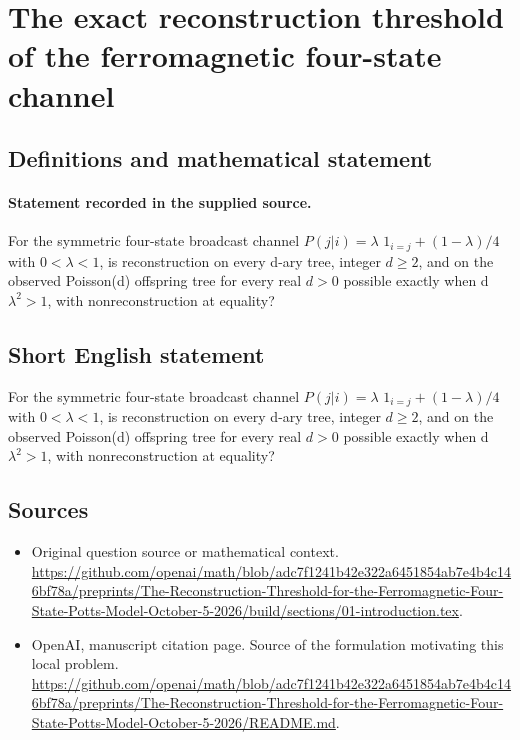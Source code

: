 \documentclass[11pt]{article}
\begin{document}
\section*{The exact reconstruction threshold of the ferromagnetic four-state channel}\label{30007361}
\subsection{Definitions and mathematical statement}
\paragraph{Statement recorded in the supplied source.}
For the symmetric four-state broadcast channel $P(j|i)=\lambda $ $1_{i=j}+(1-\lambda )/4$ with $0<\lambda <1$, is reconstruction on every d-ary tree, integer $d\geq 2$, and on the observed Poisson(d) offspring tree for every real $d>0$ possible exactly when d $\lambda ^2>1$, with nonreconstruction at equality?
\subsection{Short English statement}
For the symmetric four-state broadcast channel $P(j|i)=\lambda $ $1_{i=j}+(1-\lambda )/4$ with $0<\lambda <1$, is reconstruction on every d-ary tree, integer $d\geq 2$, and on the observed Poisson(d) offspring tree for every real $d>0$ possible exactly when d $\lambda ^2>1$, with nonreconstruction at equality?
\subsection{Sources}
\begin{itemize}
\item[S1] Original question source or mathematical context.
\url{https://github.com/openai/math/blob/adc7f1241b42e322a6451854ab7e4b4c146bf78a/preprints/The-Reconstruction-Threshold-for-the-Ferromagnetic-Four-State-Potts-Model-October-5-2026/build/sections/01-introduction.tex}.
\item[S2] OpenAI, manuscript citation page. Source of the formulation motivating this local problem.
\url{https://github.com/openai/math/blob/adc7f1241b42e322a6451854ab7e4b4c146bf78a/preprints/The-Reconstruction-Threshold-for-the-Ferromagnetic-Four-State-Potts-Model-October-5-2026/README.md}.
\end{itemize}
\end{document}
